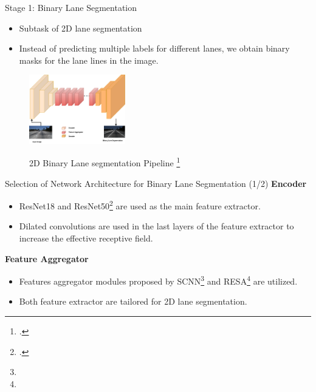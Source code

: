 \documentclass[aspectratio=169]{beamer}
\begin{document}
\begin{frame}{Stage 1: Binary Lane Segmentation}
    \begin{itemize}
        \item Subtask of 2D lane segmentation
        \item Instead of predicting multiple labels for different lanes, we obtain binary masks for the lane lines in the image.
    \end{itemize}

\begin{figure}[H]
     \centering
     
\includegraphics[width=0.4\linewidth, height=3cm]{images/2dlane_pipleline.png} 
\label{fig:subim1}

\caption{2D Binary Lane segmentation Pipeline \footcite{Tusimple} }
\label{fig:image2}
\end{figure}
\end{frame}

\begin{frame}{Selection of Network Architecture for Binary Lane Segmentation (1/2)}
    \textbf{Encoder}
    \begin{itemize}
        \item ResNet18 and ResNet50\footcite{} are used as the main feature extractor.
        \item Dilated convolutions are used in the last layers of the feature extractor to increase the effective receptive field.
    \end{itemize}

    \textbf{Feature Aggregator}
    \begin{itemize}
        \item Features aggregator modules proposed by SCNN\footnote{} and RESA\footnote{} are utilized.
        \item Both feature extractor are tailored for 2D lane segmentation.
    \end{itemize}
\end{frame}
\end{document}
